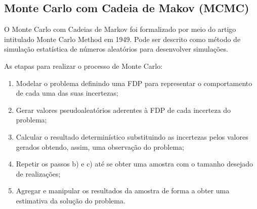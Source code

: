 \subsection{Monte Carlo com Cadeia de Makov (MCMC)}

O Monte Carlo com Cadeias de Markov foi formalizado por meio do artigo intitulado Monte Carlo Method em 1949. Pode ser descrito como método de simulação estatística de números aleatórios para desenvolver simulações.

As etapas para realizar o processo de Monte Carlo:

\begin{enumerate}[label=\alph*)]
\item Modelar o problema definindo uma FDP para representar o comportamento de cada uma das suas incertezas;
\item Gerar valores pseudoaleatórios aderentes à FDP de cada incerteza do problema;
\item Calcular o resultado determinístico substituindo as incertezas pelos valores gerados obtendo, assim, uma observação do problema;
\item Repetir os passos b) e c) até se obter uma amostra com o tamanho desejado de realizações;
\item Agregar e manipular os resultados da amostra de forma a obter uma estimativa da solução do problema.
\end{enumerate}

